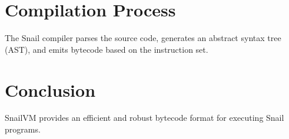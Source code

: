 \documentclass[a4paper,12pt]{article}
\begin{document}
\section{Compilation Process}
  The Snail compiler parses the source code, generates an abstract syntax tree (AST), and emits bytecode based on the instruction set.

\section{Conclusion}
  SnailVM provides an efficient and robust bytecode format for executing Snail programs.
\end{document}
